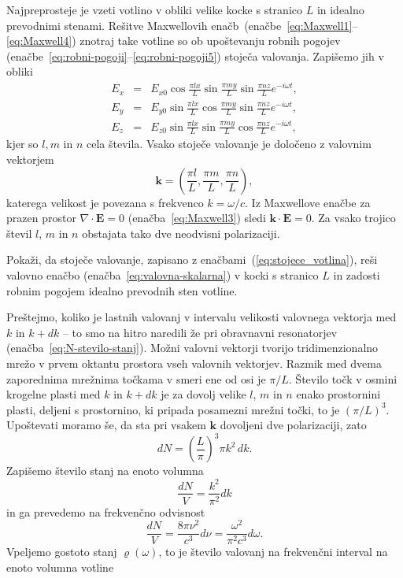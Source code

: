 Najpreprosteje je vzeti votlino v obliki velike kocke s stranico
$L$ in idealno prevodnimi stenami. Rešitve Maxwellovih enačb~(enačbe~\ref{eq:Maxwell1}--\ref{eq:Maxwell4}) 
znotraj take votline so ob upoštevanju robnih pogojev 
(enačbe~\ref{eq:robni-pogoji}--\ref{eq:robni-pogoji5}) 
stoječa valovanja. Zapišemo jih v obliki
\begin{eqnarray}
E_{x} & = & E_{x0}\cos\frac{\pi lx}{L}\sin\frac{\pi my}{L}\sin\frac{\pi nz}{L}e^{-i\omega t},\nonumber \\
E_{y} & = & E_{y0}\sin\frac{\pi lx}{L}\cos\frac{\pi my}{L}\sin\frac{\pi nz}{L}e^{-i\omega t},\nonumber \\
E_{z} & = & E_{z0}\sin\frac{\pi lx}{L}\sin\frac{\pi my}{L}\cos\frac{\pi nz}{L}e^{-i\omega t},
\label{eq:stojece_votlina}
\end{eqnarray}
kjer so $l,m$ in $n$ cela števila. Vsako stoječe valovanje je določeno z valovnim 
vektorjem
\begin{equation}
\mathbf{k}=\left(\frac{\pi l}{L},\frac{\pi m}{L},\frac{\pi n}{L}\right),
\end{equation} 
katerega velikost je povezana s frekvenco $k = \omega/c$.
Iz Maxwellove enačbe za prazen prostor $\nabla\cdot\mathbf{E}=0$ (enačba~\ref{eq:Maxwell3})
sledi $\mathbf{k}\cdot\mathbf{E}=0$. 
Za vsako trojico števil $l$, $m$ in $n$ obstajata tako dve
neodvisni polarizaciji.

\begin{definition}
 Pokaži, da stoječe valovanje, zapisano z enačbami~(\ref{eq:stojece_votlina}), reši 
 valovno enačbo (enačba~\ref{eq:valovna-skalarna}) v 
 kocki s stranico $L$ in zadosti robnim pogojem idealno prevodnih sten votline.
\end{definition}

Preštejmo, koliko je lastnih valovanj v intervalu velikosti valovnega
vektorja med $k$ in $k+dk$ -- to smo na hitro naredili že pri obravnavni
resonatorjev (enačba~\ref{eq:N-stevilo-stanj}). Možni valovni vektorji tvorijo tridimenzionalno
mrežo v prvem oktantu prostora vseh valovnih vektorjev. Razmik med
dvema zaporednima mrežnima točkama v smeri ene od osi je $\pi/L$.
Število točk v osmini krogelne plasti med $k$ in $k+dk$ je za dovolj
velike $l$, $m$ in $n$ enako prostornini plasti, deljeni
s prostornino, ki pripada posamezni mrežni točki, to je $(\pi/L)^{3}$.
Upoštevati moramo še, da sta pri vsakem $\mathbf{k}$ dovoljeni dve polarizaciji, zato
\begin{equation}
dN=\left(\frac{L}{\pi}\right)^{3}\pi k^{2}\, dk.
\label{4.2}
\end{equation}
Zapišemo število stanj na enoto volumna
\begin{equation}
\frac{dN}{V}=\frac{ k^{2}}{\pi^{2}} dk
\label{4.3}
\end{equation}
in ga prevedemo na frekvenčno odvisnost
\begin{equation}
\frac{dN}{V}=\frac{8 \pi \nu^{2} }{c^{3}}d\nu = \frac{\omega^2}{\pi^2c^3}d\omega.
\end{equation}
Vpeljemo gostoto stanj  $\varrho (\omega)$, to je število valovanj na frekvenčni interval na enoto volumna 
votline


